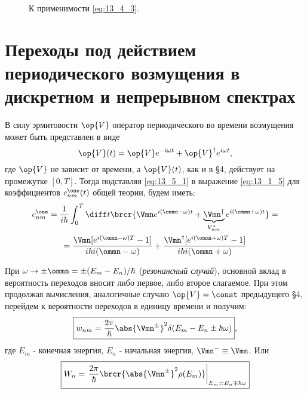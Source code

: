 \begin{figure}[h!]
\centering
{}
\caption{К применимости \eqref{eq:13_4_3}.} \label{fig:13_4}
\end{figure}

\section{Переходы под действием периодического возмущения в дискретном и непрерывном спектрах}

В силу эрмитовости $\op{V}$ оператор периодического во времени возмущения может быть представлен в виде
\begin{equation}
\label{eq:13_5_1}
\op{V}(t) = \op{V}e^{-i\omega t} + \op{V}^\dag e^{i\omega t},
\end{equation}
где $\op{V}$ не зависит от времени, а $\op{V}(t)$, как и в \S 4, действует на промежутке $[0, T]$. Тогда подставляя \eqref{eq:13_5_1} в выражение \eqref{eq:13_1_5} для коэффициентов $c_{nm}^\one (t)$ общей теории, будем иметь:
\begin{gather*}
c_{nm}^\one = \frac{1}{i \hbar} \int_0^T \diff t \brcr{\Vmn e^{i(\ommn - \omega)t} + \underbrace{\Vmn^\dag}_{V_{nm}^*} e^{i(\ommn + \omega)t}} = \\
= \frac{\Vmn [e^{i(\ommn - \omega)T} - 1]}{i \hbar i (\ommn - \omega)} + \frac{\Vmn^\dag [e^{i(\ommn + \omega)T} - 1]}{i \hbar i (\ommn + \omega)}
\end{gather*}

При $\omega \to \pm \ommn = \pm (E_m - E_n) / \hbar$ ({\em резонансный случай}), основной вклад в вероятность переходов вносит либо первое, либо второе слагаемое. При этом продолжая вычисления, аналогичные случаю $\op{V} = \const$ предыдущего \S 4, перейдем к вероятности переходов в единицу времени и получим:
\begin{equation}
\label{eq:13_5_2}
\boxed{w_{nm} = \frac{2\pi}{\hbar} \abs{\Vmn^\pm}^2 \delta(E_m - E_n \pm \hbar \omega)}, 
\end{equation}
где $E_m$ - конечная энергия, $E_n$ - начальная энергия, $\Vmn^- \equiv \Vmn$. Или
\begin{equation}
\label{eq:13_5_3}
\boxed{W_n = \left .\frac{2\pi}{\hbar} \brcr{\abs{\Vmn^\pm}^2 \rho(E_m)} \right |_{E_m = E_n \mp \hbar \omega}} 
\end{equation}

